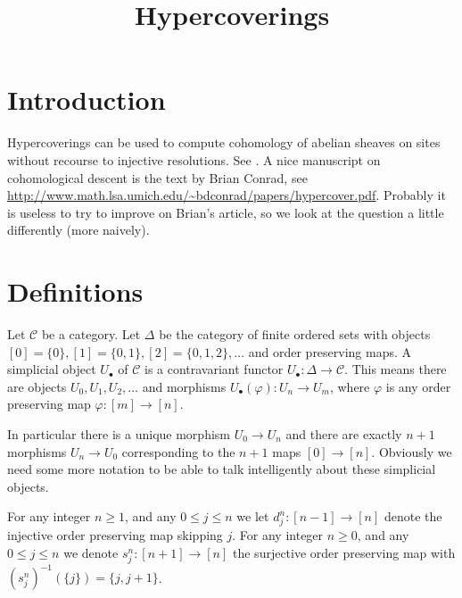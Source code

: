 

%


\title{Hypercoverings}


\maketitle

\tableofcontents

\section{Introduction}
\label{section-introduction}

\noindent
Hypercoverings can be used to compute cohomology of abelian sheaves on sites
without recourse to injective resolutions. See \cite[Expose V, Sec. 7]{SGA4}.
A nice manuscript on cohomological descent is the text by Brian Conrad,
see \url{http://www.math.lsa.umich.edu/~bdconrad/papers/hypercover.pdf}.
Probably it is useless to try to improve on Brian's article, so we look
at the question a little differently (more naively).

\section{Definitions}
\label{section-definitions}

\noindent
Let $\mathcal{C}$ be a category. Let $\Delta$ be the category of finite 
ordered sets with objects $[0]=\{0\}, [1]=\{0,1\}, [2]=\{0,1,2\},\ldots$ 
and order preserving maps. A simplicial object $U_\bullet$ of $\mathcal{C}$ 
is a contravariant functor $U_\bullet : \Delta \to \mathcal{C}$. This means 
there are objects $U_0,U_1,U_2,\ldots$ and morphisms $U_\bullet(\varphi) : 
U_n \to U_m$, where $\varphi$ is any order preserving map 
$\varphi : [m] \to [n]$.

\medskip\noindent
In particular there is a unique morphism $U_0 \to U_n$ and there are
exactly $n+1$ morphisms $U_n \to U_0$ corresponding to the $n+1$ maps
$[0] \to [n]$. Obviously we need some more notation to be able to talk 
intelligently about these simplicial objects.

\begin{definition}
\label{definition-face-degeneracy}
For any integer $n\geq 1$, and any $0\leq j \leq n$ we let $d^n_j : [n-1]
\to [n]$ denote the injective order preserving map skipping $j$. For any
integer $n\geq 0$, and any $0\leq j \leq n$ we denote $s^n_j : [n+1] 
\to [n]$ the surjective order preserving map with 
$(s^n_j)^{-1}(\{j\}) = \{j, j+1\}$.
\end{definition}

